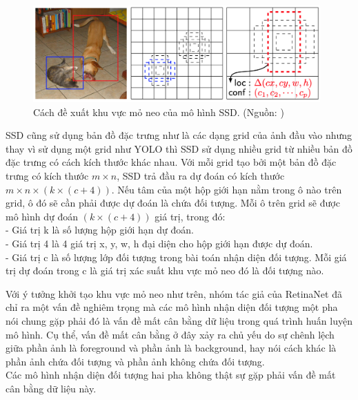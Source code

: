 {    \begin{figure}[H]
        \centering
        \includegraphics[width=11cm] {images/ssd_anchor}
        \caption{Cách đề xuất khu vực mỏ neo của mô hình SSD. (Nguồn: \cite{liu2016ssd})}
        \label{fig:ssd_anchor}
    \end{figure}
    
    \noindent
    SSD cũng sử dụng bản đồ đặc trưng như là các dạng grid của ảnh đầu vào nhưng thay vì sử dụng một grid như YOLO thì SSD sử dụng nhiều grid từ nhiều bản đồ đặc trưng có cách kích thước khác nhau.
    Với mỗi grid tạo bởi một bản đồ đặc trưng có kích thước $m × n$, SSD trả đầu ra dự đoán có kích thước $m × n × (k × (c + 4))$.
    Nếu tâm của một hộp giới hạn nằm trong ô nào trên grid, ô đó sẽ cần phải được dự đoán là chứa đối tượng.
    Mỗi ô trên grid sẽ được mô hình dự đoán $(k × (c + 4))$ giá trị, trong đó: \\
    - Giá trị k là số lượng hộp giới hạn dự đoán. \\
    - Giá trị 4 là 4 giá trị x, y, w, h đại diện cho hộp giới hạn được dự đoán. \\
    - Giá trị c là số lượng lớp đối tượng trong bài toán nhận diện đối tượng.
    Mỗi giá trị dự đoán trong c là giá trị xác suất khu vực mỏ neo đó là đối tượng nào.

    \noindent
    Với ý tưởng khởi tạo khu vực mỏ neo như trên, nhóm tác giả của RetinaNet đã chỉ ra một vấn đề nghiêm trọng mà các mô hình nhận diện đối tượng một pha nói chung gặp phải đó là vấn đề mất cân bằng dữ liệu trong quá trình huấn luyện mô hình.
    Cụ thể, vấn đề mất cân bằng ở đây xảy ra chủ yếu do sự chênh lệch giữa phần ảnh là foreground và phần ảnh là background, hay nói cách khác là phần ảnh chứa đối tượng và phần ảnh không chứa đối tượng. \\
    Các mô hình nhận diện đối tượng hai pha không thật sự gặp phải vấn đề mất cân bằng dữ liệu này.

}

